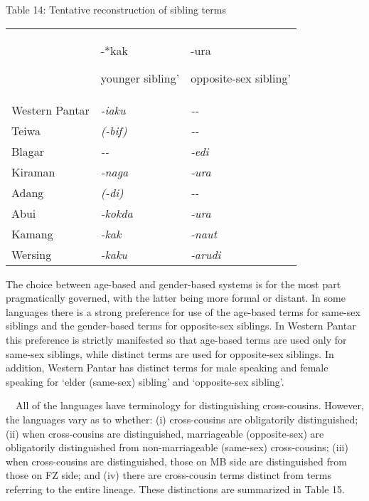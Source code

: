 {\centering
Table 14: Tentative reconstruction of sibling terms 
\par}

\begin{center}
\tablehead{}
\begin{supertabular}{m{1.0934598in}m{1.2240599in}m{1.5212599in}}
 &
\centering {}-*kak\par

\centering {\textquoteleft}younger sibling{\textquoteright} &
\centering *-ura\par

\centering\arraybslash {\textquoteleft}opposite-sex sibling{\textquoteright}\\
Western Pantar &
\textit{{}-iaku} &
\textit{{}-{}-}\\
Teiwa &
\textit{(-bif)} &
\textit{{}-{}-}\\
Blagar &
\textit{{}-{}-} &
\textit{{}-edi}\\
Kiraman &
\textit{{}-naga} &
\textit{{}-ura}\\
Adang &
\textit{(-di)} &
\textit{{}-{}-}\\
Abui &
\textit{{}-kokda} &
\textit{{}-ura}\\
Kamang &
\textit{{}-kak} &
\textit{{}-naut}\\
Wersing &
\textit{{}-kaku} &
\textit{{}-arudi}\\
\end{supertabular}
\end{center}
The choice between age-based and gender-based systems is for the most part pragmatically governed, with the latter being more formal or distant. In some languages there is a strong preference for use of the age-based terms for same-sex siblings and the gender-based terms for opposite-sex siblings. In Western Pantar this preference is strictly manifested so that age-based terms are used only for same-sex siblings, while distinct terms are used for opposite-sex siblings. In addition, Western Pantar has distinct terms for male speaking and female speaking for {\textquoteleft}elder (same-sex) sibling{\textquoteright} and {\textquoteleft}opposite-sex sibling{\textquoteright}. 

\ \ All of the languages have terminology for distinguishing cross-cousins. However, the languages vary as to whether: (i) cross-cousins are obligatorily distinguished; (ii) when cross-cousins are distinguished, marriageable (opposite-sex) are obligatorily distinguished from non-marriageable (same-sex) cross-cousins; (iii) when cross-cousins are distinguished, those on MB side are distinguished from those on FZ side; and (iv) there are cross-cousin terms distinct from terms referring to the entire lineage. These distinctions are summarized in Table 15.

